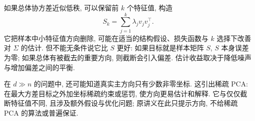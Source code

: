 如果总体协方差近似低秩, 可以保留前 $k$ 个特征值, 构造
\[
 S_k=\sum_{j=1}^k\lambda_jv_jv_j^\top.
\]
它把样本中小特征值方向删除, 可能在适当的结构假设、损失函数与 $k$ 选择下改善对 $\Sigma$ 的估计. 但不能无条件说它比 $S$ 更好: 如果目标就是样本矩阵 $S$, $S$ 本身误差为零; 如果总体有被截去的重要方向, 则截断会引入偏差. 估计收益取决于降低噪声与增加偏差之间的平衡. 

在 $d\gg n$ 的问题中, 还可能知道真实主方向只有少数非零坐标. 这引出稀疏 PCA: 在最大方差目标之外加坐标稀疏约束或惩罚, 使方向更易估计和解释. 它与仅仅截断特征值不同, 且涉及额外假设与优化问题; 原讲义在此只提示方向, 不给稀疏 PCA 的算法或普遍保证. 
